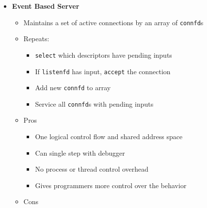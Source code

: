 \documentclass[12pt]{article}
\begin{document}
{\begin{itemize}
\begin{itemize}
\begin{enumerate}
				\end{enumerate}
				\item \textit{No shared states between clients}
				\item Both parent \& child have copies of \texttt{listenfd} and \texttt{connfd}: parent should close \texttt{connfd}, child should close \texttt{listenfd} (considering \texttt{refcnt})
				\item Pros
				\begin{itemize}
					\item Clean sharing model - file tables (o), descriptors/global var.(x)
					\item Simple and straightforward
				\end{itemize}
				\item Cons
				\begin{itemize}
					\item Additional overhead for process control
					\item Hard to share data between processes (IPC)
				\end{itemize}
			\end{itemize}
			\item \textbf{Event Based Server}
			\begin{itemize}
				\item Maintains a set of active connections by an array of \texttt{connfd}s
				\item Repeats:
				\begin{itemize}
					\item \texttt{select} which descriptors have pending inputs
					\item If \texttt{listenfd} has input, \texttt{accept} the connection
					\item Add new \texttt{connfd} to array
					\item Service all \texttt{connfd}s with pending inputs
				\end{itemize}
				\item Pros
				\begin{itemize}
					\item One logical control flow and shared address space
					\item Can single step with debugger
					\item No process or thread control overhead
					\item Gives programmers more control over the behavior
				\end{itemize}
				\item Cons
				\begin{itemize}

\end{itemize}
\end{itemize}
\end{itemize}}
\end{document}
